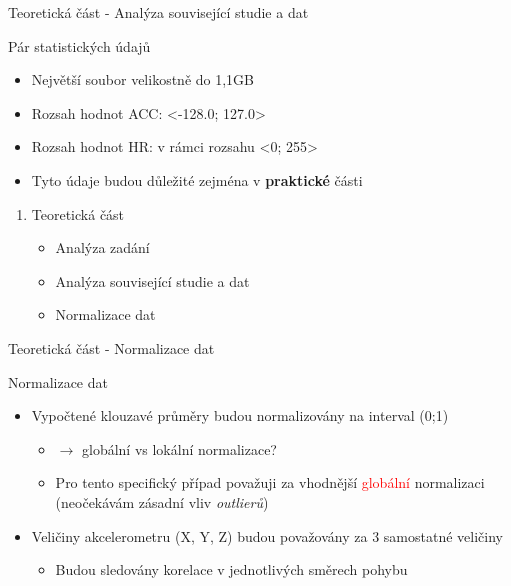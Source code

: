 \documentclass[aspectratio=169, xcolor=dvipsnames]{beamer}
\begin{document}
\begin{frame}{Teoretická část - Analýza související studie a dat}
  \begin{block}{Pár statistických údajů}
    \begin{itemize}
      \item Největší soubor velikostně do 1,1GB
      \item Rozsah hodnot ACC: \textless-128.0; 127.0\textgreater 
      \item Rozsah hodnot HR: v rámci rozsahu \textless0; 255\textgreater
      \item Tyto údaje budou důležité zejména v \textbf{praktické} části
    \end{itemize} 
  \end{block} 
\end{frame}

\begin{frame}{}
	\begin{center}
\begin{enumerate}
    \item Teoretická část
      \begin{itemize}
        \item Analýza zadání 
        \item Analýza související studie a dat
        \item Normalizace dat
       \end{itemize}
   \end{enumerate}
	\end{center}
\end{frame}


\begin{frame}{Teoretická část - Normalizace dat}
  \begin{block}{Normalizace dat}
    \begin{itemize}
        \pause
      \item Vypočtené klouzavé průměry budou normalizovány na interval (0;1)
        \pause
        \begin{itemize}
          \item $\to$ globální vs lokální normalizace? 
            \pause
          \item Pro tento specifický případ považuji za vhodnější \textcolor{Red}{globální} normalizaci (neočekávám zásadní vliv \textit{outlierů}) 
        \end{itemize}
        \pause
      \item Veličiny akcelerometru (X, Y, Z) budou považovány za 3 samostatné veličiny
        \begin{itemize}
          \item Budou sledovány korelace v jednotlivých směrech pohybu
        \end{itemize}
    \end{itemize} 
  \end{block} 
\end{frame}
\end{document}
